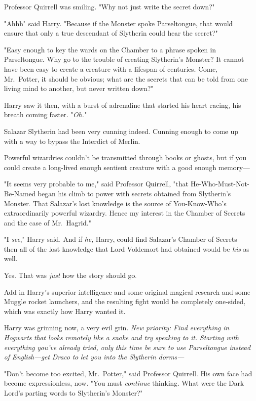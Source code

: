Professor Quirrell was smiling. "Why not just write the secret down?"

"Ahhh{\el}" said Harry. "Because if the Monster spoke Parseltongue, that
would ensure that only a true descendant of Slytherin could hear the secret?"

"Easy enough to key the wards on the Chamber to a phrase spoken in
Parseltongue. Why go to the trouble of creating Slytherin's Monster? It cannot
have been easy to create a creature with a lifespan of centuries. Come,
Mr.~Potter, it should be obvious; what are the secrets that can be told from
one living mind to another, but never written down?"

Harry saw it then, with a burst of adrenaline that started his heart racing,
his breath coming faster. "\emph{Oh.}"

Salazar Slytherin had been very cunning indeed. Cunning enough to come up with
a way to bypass the Interdict of Merlin.

Powerful wizardries couldn't be transmitted through books or ghosts, but if you
could create a long-lived enough sentient creature with a good enough memory—

"It seems very probable to me," said Professor Quirrell, "that
He-Who-Must-Not-Be-Named began his climb to power with secrets obtained from
Slytherin's Monster. That Salazar's lost knowledge is the source of
You-Know-Who's extraordinarily powerful wizardry. Hence my interest in the
Chamber of Secrets and the case of Mr.~Hagrid."

"I \emph{see}," Harry said. And if \emph{he,} Harry, could find Salazar's
Chamber of Secrets{\el} then all of the lost knowledge that Lord Voldemort
had obtained would be \emph{his} as well.

Yes. That was \emph{just} how the story should go.

Add in Harry's superior intelligence and some original magical research and
some Muggle rocket launchers, and the resulting fight would be completely
one-sided, which was exactly how Harry wanted it.

Harry was grinning now, a very evil grin. \emph{New priority: Find everything
in Hogwarts that looks remotely like a snake and try speaking to it. Starting
with everything you've already tried, only this time be sure to use
Parseltongue instead of English—get Draco to let you into the Slytherin
dorms—}

"Don't become too excited, Mr.~Potter," said Professor Quirrell. His own face
had become expressionless, now. "You must \emph{continue} thinking. What were
the Dark Lord's parting words to Slytherin's Monster?"


